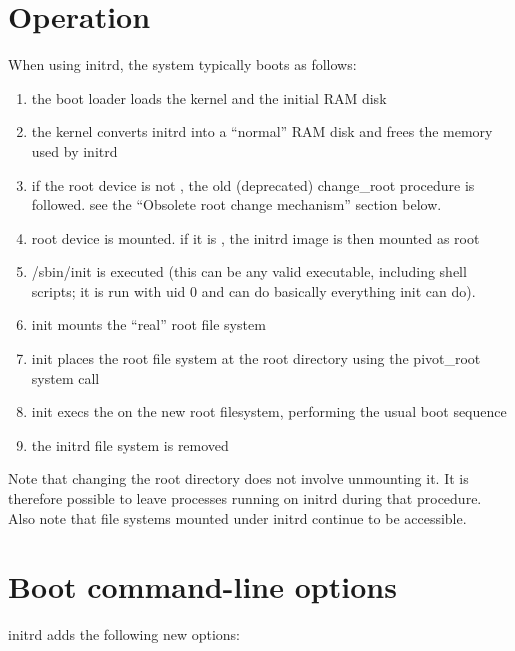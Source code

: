 \documentclass[a4paper,8pt,english]{sphinxmanual}
\begin{document}
\section{Operation}
\label{admin-guide/initrd:operation}
When using initrd, the system typically boots as follows:
\begin{enumerate}
\item {} 
the boot loader loads the kernel and the initial RAM disk

\item {} 
the kernel converts initrd into a ``normal'' RAM disk and
frees the memory used by initrd

\item {} 
if the root device is not , the old (deprecated)
change\_root procedure is followed. see the ``Obsolete root change
mechanism'' section below.

\item {} 
root device is mounted. if it is , the initrd image is
then mounted as root

\item {} 
/sbin/init is executed (this can be any valid executable, including
shell scripts; it is run with uid 0 and can do basically everything
init can do).

\item {} 
init mounts the ``real'' root file system

\item {} 
init places the root file system at the root directory using the
pivot\_root system call

\item {} 
init execs the  on the new root filesystem, performing
the usual boot sequence

\item {} 
the initrd file system is removed

\end{enumerate}

Note that changing the root directory does not involve unmounting it.
It is therefore possible to leave processes running on initrd during that
procedure. Also note that file systems mounted under initrd continue to
be accessible.


\section{Boot command-line options}
\label{admin-guide/initrd:boot-command-line-options}
initrd adds the following new options:
\end{document}
